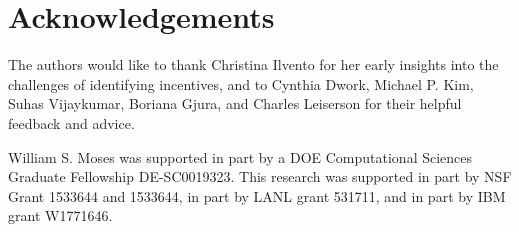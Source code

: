 \section{Acknowledgements}

The authors would like to thank Christina Ilvento for her early insights into the challenges of identifying incentives, and to Cynthia Dwork, Michael P. Kim, Suhas Vijaykumar, Boriana Gjura, and Charles Leiserson for their helpful feedback and advice.

William S. Moses was supported in part by a DOE Computational Sciences Graduate Fellowship DE-SC0019323. This research was supported in part by NSF Grant 1533644 and 1533644, in part by LANL grant 531711, and in part by IBM grant W1771646.